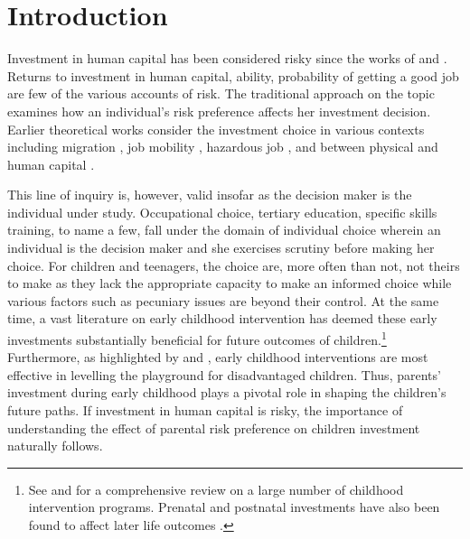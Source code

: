\documentclass[emulatestandardclasses, 10pt, abstract = true]{scrartcl}
\begin{document}
\section{Introduction}
Investment in human capital has been considered risky since the works of \citet{becker1962investment, levhari1974effect} and \citet{schultz1971investment}. Returns to investment in human capital, ability, probability of getting a good job are few of the various accounts of risk. The traditional approach on the topic examines how an individual's risk preference affects her investment decision. Earlier theoretical works consider the investment choice in various contexts including migration \citep{david1974fortune}, job mobility \citep{johnson1978theory}, hazardous job \citep{thaler1976value}, and between physical and human capital \citep{levhari1974effect}. 

This line of inquiry is, however, valid insofar as the decision maker is the individual under study. Occupational choice, tertiary education, specific skills training, to name a few, fall under the domain of individual choice wherein an individual is the decision maker and she exercises scrutiny before making her choice. For children and teenagers, the choice are, more often than not, not theirs to make as they lack the appropriate capacity to make an informed choice while various factors such as pecuniary issues are beyond their control. At the same  time, a vast literature on early childhood intervention has deemed these early investments substantially beneficial for future outcomes of children.\footnote{See \citet{Currie2001} and \citet{NORES2010} for a comprehensive review on a large number of childhood intervention programs. Prenatal and postnatal investments have also been found to affect later life outcomes \citep{currie2011human, almond2011killing, currie2013early}.} Furthermore, as highlighted by \citet{jacob2008improving} and \citet{duflo2011poor}, early childhood interventions are most effective in levelling the playground for disadvantaged children. Thus, parents' investment during early childhood plays a pivotal role in shaping the children's future paths. If investment in human capital is risky, the importance of understanding the effect of parental risk preference on children investment naturally follows. 
    
\end{document}
